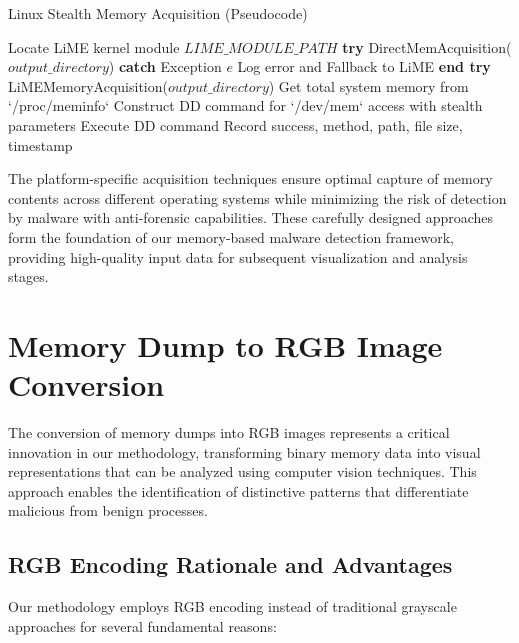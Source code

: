 \begin{algorithm}[!htbp]
\caption{Linux Stealth Memory Acquisition (Pseudocode)}
\label{alg:linux-dump}
\begin{algorithmic}[1]
    \State Locate LiME kernel module $LIME\_MODULE\_PATH$
        \State \textbf{try}
            \State \Return DirectMemAcquisition($output\_directory$)
        \State \textbf{catch} {Exception $e$}
            \State Log error and Fallback to LiME
        \State \textbf{end try}
    \EndIf
    \Return LiMEMemoryAcquisition($output\_directory$)
\EndProcedure
\Statex
{}
    \State Get total system memory from `/proc/meminfo`
    \State Construct DD command for `/dev/mem` access with stealth parameters
    \State Execute DD command
    \State Record success, method, path, file size, timestamp
\EndProcedure
\end{algorithmic}
\end{algorithm}

The platform-specific acquisition techniques ensure optimal capture of memory contents across different operating systems while minimizing the risk of detection by malware with anti-forensic capabilities. These carefully designed approaches form the foundation of our memory-based malware detection framework, providing high-quality input data for subsequent visualization and analysis stages.

\section{Memory Dump to RGB Image Conversion}
\label{sec:rgb-conversion}

The conversion of memory dumps into RGB images represents a critical innovation in our methodology, transforming binary memory data into visual representations that can be analyzed using computer vision techniques. This approach enables the identification of distinctive patterns that differentiate malicious from benign processes.

\subsection{RGB Encoding Rationale and Advantages}
\label{subsec:rgb-rationale}

Our methodology employs RGB encoding instead of traditional grayscale approaches for several fundamental reasons:

